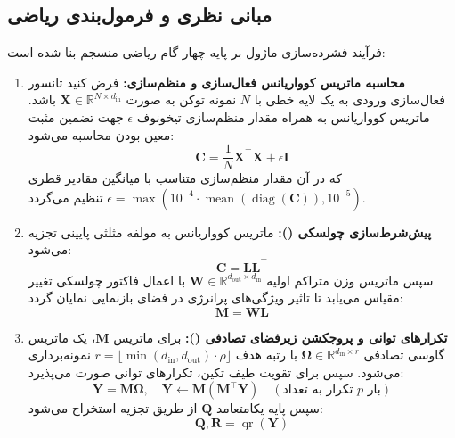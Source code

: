 \subsection{مبانی نظری و فرمول‌بندی ریاضی}
فرآیند فشرده‌سازی ماژول  بر پایه چهار گام ریاضی منسجم بنا شده است:
\begin{enumerate}
    \item \textbf{محاسبه ماتریس کوواریانس فعال‌سازی و منظم‌سازی:}
    فرض کنید تانسور فعال‌سازی ورودی به یک لایه خطی با $N$ نمونه توکن به صورت $\mathbf{X} \in \mathbb{R}^{N \times d_{\text{in}}}$ باشد. ماتریس کوواریانس به همراه مقدار منظم‌سازی تیخونوف $\epsilon$ جهت تضمین مثبت معین بودن محاسبه می‌شود:
    \begin{equation}
    \mathbf{C} = \frac{1}{N} \mathbf{X}^\top \mathbf{X} + \epsilon \mathbf{I}
    \end{equation}
    که در آن مقدار منظم‌سازی متناسب با میانگین مقادیر قطری $\epsilon = \max(10^{-4} \cdot \operatorname{mean}(\operatorname{diag}(\mathbf{C})), 10^{-5})$ تنظیم می‌گردد.

    \item \textbf{پیش‌شرط‌سازی چولسکی ():}
    ماتریس کوواریانس به مولفه مثلثی پایینی تجزیه می‌شود:
    \begin{equation}
    \mathbf{C} = \mathbf{L} \mathbf{L}^\top
    \end{equation}
    سپس ماتریس وزن متراکم اولیه $\mathbf{W} \in \mathbb{R}^{d_{\text{out}} \times d_{\text{in}}}$ با اعمال فاکتور چولسکی تغییر مقیاس می‌یابد تا تاثیر ویژگی‌های پرانرژی در فضای بازنمایی نمایان گردد:
    \begin{equation}
    \mathbf{M} = \mathbf{W} \mathbf{L}
    \end{equation}

    \item \textbf{تکرارهای توانی و پروجکشن زیرفضای تصادفی ():}
    برای ماتریس $\mathbf{M}$، یک ماتریس گاوسی تصادفی $\mathbf{\Omega} \in \mathbb{R}^{d_{\text{in}} \times r}$ با رتبه هدف $r = \lfloor \min(d_{\text{in}}, d_{\text{out}}) \cdot \rho \rfloor$ نمونه‌برداری می‌شود. سپس برای تقویت طیف تکین، تکرارهای توانی صورت می‌پذیرد:
    \begin{equation}
    \mathbf{Y} = \mathbf{M} \mathbf{\Omega}, \quad \mathbf{Y} \leftarrow \mathbf{M} (\mathbf{M}^\top \mathbf{Y}) \quad (\text{تکرار به تعداد } p \text{ بار})
    \end{equation}
    سپس پایه یکامتعامد $\mathbf{Q}$ از طریق تجزیه  استخراج می‌شود:
    \begin{equation}
    \mathbf{Q}, \mathbf{R} = \operatorname{qr}(\mathbf{Y})
    \end{equation}


\end{enumerate}
